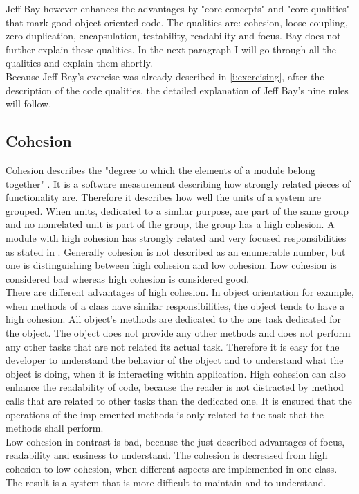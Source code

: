 Jeff Bay however enhances the advantages by "core concepts" and "core qualities" that mark good object oriented code. The qualities are: cohesion, loose coupling, zero duplication, encapsulation, testability, readability and focus.
Bay does not further explain these qualities. In the next paragraph I will go through all the qualities and explain them shortly. \\

Because Jeff Bay's exercise was already described in \ref{i:exercising}, after the description of the code qualities, the detailed explanation of Jeff Bay's nine rules will follow. 

\subsection*{Cohesion}
\label{cohesion}
Cohesion describes the "degree to which the elements of a module belong together" \cite{cohesionBook}. It is a software measurement describing how strongly related pieces of functionality are. Therefore it describes how well the units of a system are grouped. When units, dedicated to a simliar purpose, are part of the same group and no nonrelated unit is part of the group, the group has a high cohesion. A module with high cohesion has strongly related and very focused responsibilities as stated in \cite[Cohesion]{wiki}. Generally cohesion is not described as an enumerable number, but one is distinguishing between high cohesion and low cohesion. Low cohesion is considered bad whereas high cohesion is considered good.\\

There are different advantages of high cohesion. In object orientation for example, when methods of a class have similar responsibilities, the object tends to have a high cohesion. All object's methods are dedicated to the one task dedicated for the object. The object does not provide any other methods and does not perform any other tasks that are not related its actual task. Therefore it is easy for the developer to understand the behavior of the object and to understand what the object is doing, when it is interacting within application. High cohesion can also enhance the readability of code, because the reader is not distracted by method calls that are related to other tasks than the dedicated one. It is ensured that the operations of the implemented methods is only related to the task that the methods shall perform. \\

Low cohesion in contrast is bad, because the just described advantages of focus, readability and easiness to understand. The cohesion is decreased from high cohesion to low cohesion, when different aspects are implemented in one class. The result is a system that is more difficult to maintain and to understand. 

